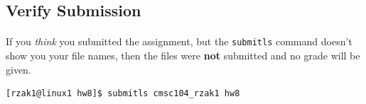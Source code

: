 \documentclass[letter,11pt]{article}
\begin{document}
\subsection*{Verify Submission}
\paragraph{}If you \textit{think} you submitted the assignment, but the \texttt{submitls} command doesn't show you your file names, then the files were \textbf{not} submitted and no grade will be given.
\begin{verbatim}
[rzak1@linux1 hw8]$ submitls cmsc104_rzak1 hw8
\end{verbatim}
\end{document}
